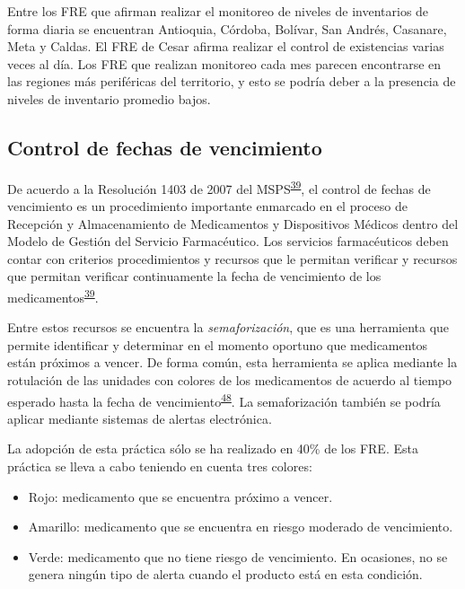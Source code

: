 \documentclass[
  oneside]{book}
\begin{document}
Entre los FRE que afirman realizar el monitoreo de niveles de inventarios de forma diaria se encuentran Antioquia, Córdoba, Bolívar, San Andrés, Casanare, Meta y Caldas. El FRE de Cesar afirma realizar el control de existencias varias veces al día. Los FRE que realizan monitoreo cada mes parecen encontrarse en las regiones más periféricas del territorio, y esto se podría deber a la presencia de niveles de inventario promedio bajos.

\hypertarget{control-de-fechas-de-vencimiento}{%
\subsection{Control de fechas de vencimiento}\label{control-de-fechas-de-vencimiento}}

De acuerdo a la Resolución 1403 de 2007 del MSPS\textsuperscript{\protect\hyperlink{ref-MinisteriodeSaludyProteccionSocial2007}{39}}, el control de fechas de vencimiento es un procedimiento importante enmarcado en el proceso de Recepción y Almacenamiento de Medicamentos y Dispositivos Médicos dentro del Modelo de Gestión del Servicio Farmacéutico. Los servicios farmacéuticos deben contar con criterios procedimientos y recursos que le permitan verificar y recursos que permitan verificar continuamente la fecha de vencimiento de los medicamentos\textsuperscript{\protect\hyperlink{ref-MinisteriodeSaludyProteccionSocial2007}{39}}.

Entre estos recursos se encuentra la \emph{semaforización}, que es una herramienta que permite identificar y determinar en el momento oportuno que medicamentos están próximos a vencer. De forma común, esta herramienta se aplica mediante la rotulación de las unidades con colores de los medicamentos de acuerdo al tiempo esperado hasta la fecha de vencimiento\textsuperscript{\protect\hyperlink{ref-HernandezVera2017}{48}}. La semaforización también se podría aplicar mediante sistemas de alertas electrónica.

La adopción de esta práctica sólo se ha realizado en 40\% de los FRE. Esta práctica se lleva a cabo teniendo en cuenta tres colores:

\begin{itemize}
\item
  Rojo: medicamento que se encuentra próximo a vencer.
\item
  Amarillo: medicamento que se encuentra en riesgo moderado de vencimiento.
\item
  Verde: medicamento que no tiene riesgo de vencimiento. En ocasiones, no se genera ningún tipo de alerta cuando el producto está en esta condición.
\end{itemize}
\end{document}
